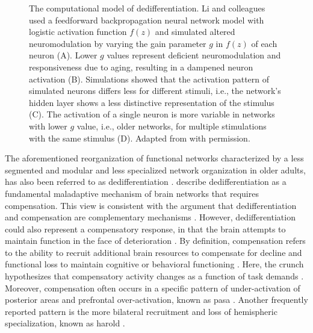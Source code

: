\begin{figure}[h]
\def\svgwidth{\columnwidth}

\caption[The computational model of dedifferentiation.]{The computational model of dedifferentiation. Li and colleagues \cite{Li2001,Li2002} used a feedforward backpropagation neural network model with logistic activation function $f(z)$ and simulated altered neuromodulation by varying the gain parameter $g$ in $f(z)$ of each neuron (A). Lower $g$ values represent deficient neuromodulation and responsiveness due to aging, resulting in a dampened neuron activation (B). Simulations showed that the activation pattern of simulated neurons differs less for different stimuli, i.e., the network's hidden layer shows a less distinctive representation of the stimulus (C). The activation of a single neuron is more variable in networks with lower $g$ value, i.e., older networks, for multiple stimulations with the same stimulus (D). Adapted from \citeauthor{Li2001} \cite{Li2001} with permission.}
\label{fig:dedifferentiation}
\end{figure}

\noindent The aforementioned reorganization of functional networks characterized by a less segmented and modular and less specialized network organization in older adults, has also been referred to as dedifferentiation \cite{Deery2023, Koen2019, Sala-Llonch2015}. \citeauthor{Fornito2015} \cite{Fornito2015} describe dedifferentiation as a fundamental maladaptive mechanism of brain networks that requires compensation. This view is consistent with the argument that dedifferentiation and compensation are complementary mechanisms \cite{Reuter-Lorenz2010}. However, dedifferentiation could also represent a compensatory response, in that the brain attempts to maintain function in the face of deterioration \cite{Stern2009}. By definition, compensation refers to the ability to recruit additional brain resources to compensate for decline and functional loss to maintain cognitive or behavioral functioning \cite{Reuter-Lorenz2010, Grady2012}. Here, the \gls{crunch} hypothesizes that compensatory activity changes as a function of task demands \cite{Festini2018}. Moreover, compensation often occurs in a specific pattern of under-activation of posterior areas and prefrontal over-activation, known as \gls{pasa} \cite{Davis2007}. Another frequently reported pattern is the more bilateral recruitment and loss of hemispheric specialization, known as \gls{harold} \cite{Cabeza2002}.

